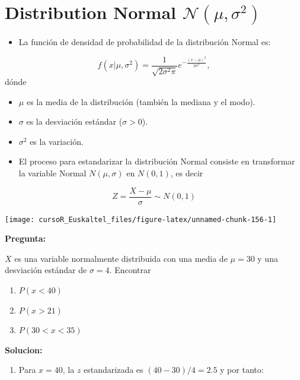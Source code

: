 \documentclass[]{book}
\providecommand{\tightlist}{%
  \setlength{\itemsep}{0pt}\setlength{\parskip}{0pt}}
\begin{document}
\section{\texorpdfstring{Distribution Normal
\(\mathcal{N}(\mu,\sigma^2)\)}{Distribution Normal \textbackslash{}mathcal\{N\}(\textbackslash{}mu,\textbackslash{}sigma\^{}2)}}\label{distribution-normal-mathcalnmusigma2}

\begin{itemize}
\tightlist
\item
  La función de densidad de probabilidad de la distribución Normal es:
\end{itemize}

\[
f(x | \mu,\sigma^2) = \frac{1}{\sqrt{2\sigma^2\pi}} e ^{-\frac{(x-\mu)^2}{2\sigma^2}},
\] dónde

\begin{itemize}
\item
  \(\mu\) es la media de la distribución (también la mediana y el modo).
\item
  \(\sigma\) es la desviación estándar (\(\sigma>0\)).
\item
  \(\sigma^2\) es la variación.
\item
  El proceso para estandarizar la distribución Normal consiste en
  transformar la variable Normal \(N(\mu,\sigma)\) en \(N(0,1)\), es
  decir
\end{itemize}

\[
Z = \frac{X-\mu}{\sigma} \sim N(0,1)
\]

\begin{center}\texttt{[image: cursoR\_Euskaltel\_files/figure-latex/unnamed-chunk-156-1]} \end{center}

\textbf{Pregunta:}

\(X\) es una variable normalmente distribuida con una media de
\(\mu = 30\) y una desviación estándar de \(\sigma = 4\). Encontrar

\begin{enumerate}
\def\labelenumi{\alph{enumi})}
\item
  \(P(x<40)\)
\item
  \(P(x>21)\)
\item
  \(P(30<x<35)\)
\end{enumerate}

\textbf{Solucion:}

\begin{enumerate}
\def\labelenumi{\alph{enumi})}
\tightlist
\item
  Para \(x=40\), la \(z\) estandarizada es \((40-30)/4=2.5\) y por
  tanto:
\end{enumerate}
\end{document}
